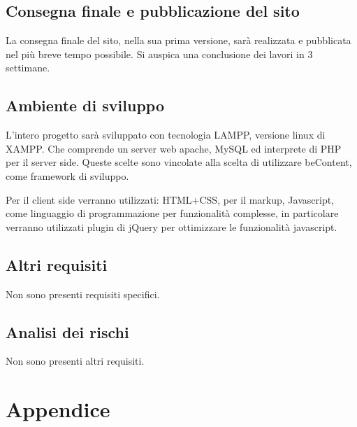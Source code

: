 \documentclass[a4paper,12pt,hidelinks]{report}
\begin{document}
\section{Consegna finale e pubblicazione del sito}
  La consegna finale del sito, nella sua prima versione, sarà realizzata e pubblicata nel più breve tempo possibile. 
  Si auspica una conclusione dei lavori in 3 settimane.
  
\section{Ambiente di sviluppo}
  L'intero progetto sarà sviluppato con tecnologia LAMPP, versione linux di XAMPP. 
  Che comprende un server web apache, MySQL ed interprete di PHP per il server side. Queste scelte sono vincolate 
  alla scelta di utilizzare beContent, come framework di sviluppo.
  \par Per il client side verranno utilizzati: HTML+CSS, per il markup, Javascript, come linguaggio di programmazione per funzionalità complesse, in particolare verranno utilizzati plugin di 
  jQuery per ottimizzare le funzionalità javascript.

\section{Altri requisiti}
  Non sono presenti requisiti specifici.

\section{Analisi dei rischi}
  Non sono presenti altri requisiti.

\chapter{Appendice}  
\end{document}
